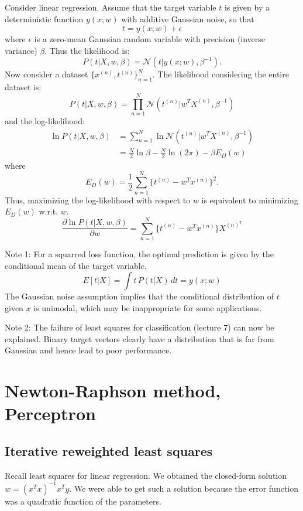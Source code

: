\documentclass[a4paper,12pt]{article}
\begin{document}
Consider linear regression. Assume that the target variable $t$ is given by a deterministic function $y(x; w)$ with additive Gaussian noise, so that 
$$t = y(x; w) + \epsilon$$
where $\epsilon$ is a zero-mean Gaussian random variable with precision (inverse variance) $\beta$. Thus the likelihood is:  
$$P(t|X, w, \beta) = \mathcal{N}(t|y(x;w), \beta^{-1}).$$
Now consider a dataset $\{x^{(n)}, t^{(n)}\}_{n=1}^N$. The likelihood considering the entire dataset is: 
$$P(t|X, w, \beta) = \prod_{n=1}^N \mathcal{N}(t^{(n)}|w^TX^{(n)}, \beta^{-1})$$
and the log-likelihood: 
\begin{align*}
\ln P(t|X, w, \beta) &= \sum_{n=1}^N \ln \mathcal{N}(t^{(n)}|w^TX^{(n)}, \beta^{-1})\\
	&= \frac{N}{2} \ln \beta - \frac{N}{2} \ln (2\pi) - \beta E_D(w)
\end{align*}
where 
$$E_D(w) = \frac{1}{2} \sum_{n=1}^N \{t^{(n)} - w^Tx^{(n)}\}^2.$$
Thus, maximizing the log-likelihood with respect to $w$ is equivalent to minimizing $E_D(w)$ w.r.t. $w$. 
$$\frac{\partial \ln P(t|X, w, \beta)}{\partial w} = \sum_{n=1}^N \{t^{(n)} - w^Tx^{(n)}\} X^{(n)^T}$$

Note 1: For a squarred loss function, the optimal prediction is given by the conditional mean of the target variable. 
$$E[t|X] = \int t \,P(t|X)\,dt = y(x; w)$$
The Gaussian noise assumption implies that the conditional distribution of $t$ given $x$ is unimodal, which may be inappropriate for some applications. 

Note 2: The failure of least squares for classification (lecture 7) can now be explained. Binary target vectors clearly have a distribution that is far from Gaussian and hence lead to poor performance. 




\clearpage

\section{Newton-Raphson method, Perceptron}

\subsection{Iterative reweighted least squares}

Recall least squares for linear regression. We obtained the closed-form solution $w = (x^Tx)^{-1}x^Ty$. We were able to get such a solution because the error function was a quadratic function of the parameters. 
\end{document}
